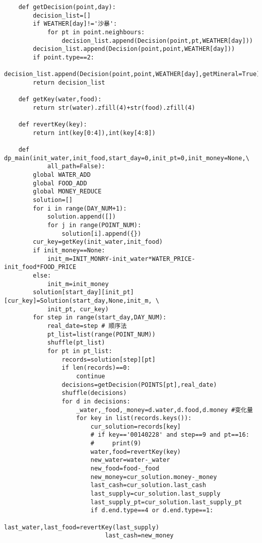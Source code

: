 \documentclass[bwprint]{cumcmthesis} %
\begin{document}
\begin{appendices}
\begin{lstlisting}
    def getDecision(point,day):
        decision_list=[]
        if WEATHER[day]!='沙暴':
            for pt in point.neighbours:
                decision_list.append(Decision(point,pt,WEATHER[day]))
        decision_list.append(Decision(point,point,WEATHER[day]))
        if point.type==2:
            decision_list.append(Decision(point,point,WEATHER[day],getMineral=True))
        return decision_list
    
    def getKey(water,food):
        return str(water).zfill(4)+str(food).zfill(4)
    
    def revertKey(key):
        return int(key[0:4]),int(key[4:8])
    
    def dp_main(init_water,init_food,start_day=0,init_pt=0,init_money=None,\
            all_path=False):
        global WATER_ADD
        global FOOD_ADD
        global MONEY_REDUCE
        solution=[]
        for i in range(DAY_NUM+1):
            solution.append([])
            for j in range(POINT_NUM):
                solution[i].append({})            
        cur_key=getKey(init_water,init_food)
        if init_money==None:
            init_m=INIT_MONRY-init_water*WATER_PRICE-init_food*FOOD_PRICE
        else:
            init_m=init_money
        solution[start_day][init_pt][cur_key]=Solution(start_day,None,init_m, \
            init_pt, cur_key)
        for step in range(start_day,DAY_NUM):
            real_date=step # 顺序法
            pt_list=list(range(POINT_NUM))
            shuffle(pt_list)
            for pt in pt_list:
                records=solution[step][pt]
                if len(records)==0:
                    continue                   
                decisions=getDecision(POINTS[pt],real_date)
                shuffle(decisions)
                for d in decisions:
                    _water,_food,_money=d.water,d.food,d.money #变化量
                    for key in list(records.keys()):
                        cur_solution=records[key]
                        # if key=='00140228' and step==9 and pt==16:
                        #     print(9)
                        water,food=revertKey(key)
                        new_water=water-_water
                        new_food=food-_food
                        new_money=cur_solution.money-_money
                        last_cash=cur_solution.last_cash
                        last_supply=cur_solution.last_supply
                        last_supply_pt=cur_solution.last_supply_pt
                        if d.end.type==4 or d.end.type==1:
                            last_water,last_food=revertKey(last_supply)
                            last_cash=new_money

\end{lstlisting}
\end{appendices}
\end{document}
